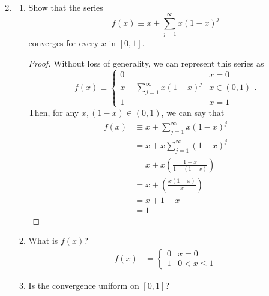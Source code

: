\documentclass{article}
\begin{document}
\begin{enumerate}
\begin{enumerate}
\begin{align*}
                        \end{align*}
            \end{enumerate}
            \setcounter{enumi}{4}
      \item \begin{enumerate}
                  \item Show that the series
                        \[
                              f(x)\equiv x+\sum_{j=1}^\infty x(1-x)^j
                        \]
                        converges for every $x$ in $[0,1]$.
                        \begin{proof}
                              Without loss of generality, we can represent this series as
                              \[
                                    f(x)\equiv\begin{cases}
                                          0                            & x = 0       \\
                                          x+\sum_{j=1}^\infty x(1-x)^j & x \in (0,1) \\
                                          1                            & x = 1
                                    \end{cases}.
                              \]
                              Then, for any $x, (1-x)\in(0,1)$, we can say that
                              \begin{align*}
                                    f(x) & \equiv x+\sum_{j=1}^\infty x(1-x)^j     \\
                                         & = x + x\sum_{j=1}^\infty (1-x)^j        \\
                                         & = x + x\left(\frac{1-x}{1-(1-x)}\right) \\
                                         & = x + \left(\frac{x(1-x)}{x}\right)     \\
                                         & = x + 1 - x                             \\
                                         & = 1
                              \end{align*}
                        \end{proof}
                  \item What is $f(x)$?
                        \begin{align}
                              f(x) & = \begin{cases}
                                    0 & x = 0        \\
                                    1 & 0 < x \leq 1
                              \end{cases}
                        \end{align}
                  \item Is the convergence uniform on $[0,1]$?


\end{enumerate}
\end{enumerate}
\end{document}
